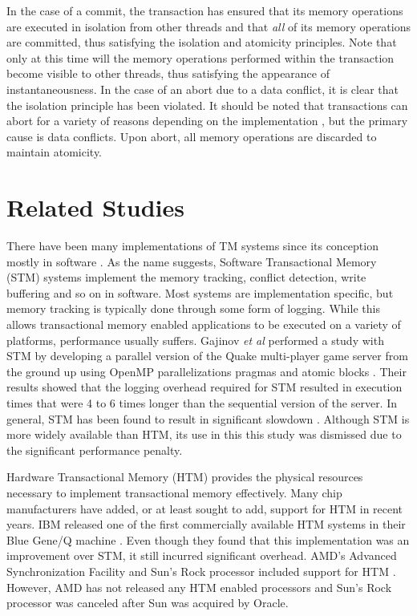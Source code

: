 \documentclass[11pt]{book}
\begin{document}
In the case of a commit, the transaction has ensured that its memory operations are
executed in isolation from other threads and that \emph{all} of its memory operations are
committed, thus satisfying the isolation and atomicity principles.  Note that only at this
time will the memory operations performed within the transaction become visible to other
threads, thus satisfying the appearance of instantaneousness.  In the case of an abort due
to a data conflict, it is clear that the isolation principle has been violated.  It should
be noted that transactions can abort for a variety of reasons depending on the
implementation \cite{intel_opt_man,chung_amd}, but the primary cause is data conflicts.
Upon abort, all memory operations are discarded to maintain atomicity.

\section{Related Studies}

There have been many implementations of TM systems since its conception mostly in software
\cite{yoo_tsx,chitters_tsx,rock_dice,chung_amd,blue_wang,quake_stm,stm_cascaval}.  As the
name suggests, Software Transactional Memory (STM) systems implement the memory tracking,
conflict detection, write buffering and so on in software.  Most systems are
implementation specific, but memory tracking is typically done through some form of
logging.  While this allows transactional memory enabled applications to be executed on a
variety of platforms, performance usually suffers.  Gajinov \emph{et al} performed a study
with STM by developing a parallel version of the Quake multi-player game server from the
ground up using OpenMP parallelizations pragmas and atomic blocks \cite{quake_stm}.  Their
results showed that the logging overhead required for STM resulted in execution times that
were 4 to 6 times longer than the sequential version of the server.  In general, STM has
been found to result in significant slowdown \cite{stm_cascaval}.  Although STM is more
widely available than HTM, its use in this this study was dismissed due to the significant
performance penalty.

Hardware Transactional Memory (HTM) provides the physical resources necessary to implement
transactional memory effectively.  Many chip manufacturers have added, or at least sought
to add, support for HTM in recent years.  IBM released one of the first commercially
available HTM systems in their Blue Gene/Q machine \cite{blue_wang}.  Even though they
found that this implementation was an improvement over STM, it still incurred significant
overhead.  AMD's Advanced Synchronization Facility and Sun's Rock processor included
support for HTM \cite{chung_amd,rock_dice}.  However, AMD has not released any HTM enabled
processors and Sun's Rock processor was canceled after Sun was acquired by Oracle.
\end{document}
